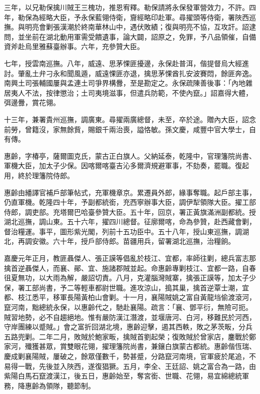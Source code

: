 \begin{pinyinscope}
三年，以兄勒保擒川賊王三槐功，推恩宥釋。勒保請將永保發軍營效力，不許。四年，勒保為經略大臣，予永保藍翎侍衛，齎經略印赴軍。尋擢頭等侍衛，署陜西巡撫。與明亮會剿張漢潮於終南華林山中，遇伏敗績；復與明亮不協，互攻訐。詔逮問，並坐前在湖北動用軍需受饋遺事，論大闢，詔原之，免罪，予八品領催，自備資斧赴烏里雅蘇臺辦事。六年，充參贊大臣。

七年，授雲南巡撫。八年，威遠、思茅惈匪擾邊，永保赴普洱，偕提督烏大經進討。肇亂土弁刁永和聞風遁，威遠惈匪亦退，擒思茅惈酋扎安波賽悶，餘匪奔逸。南興土司張輔國屢與孟連土司爭界構釁，至是勘定之。永保疏陳善後事：「內地雜居夷人不法，按律懲治；土司夷境滋事，但遣兵防範，不使內竄。」詔嘉得大體，弭邊釁，賞花翎。

十三年，兼署貴州巡撫，調廣東。尋擢兩廣總督，未至，卒於途。贈內大臣，詔念前勞，曾籍沒，家無餘貲，賜銀千兩治喪，謚恪敏。孫文慶，咸豐中官大學士，自有傳。

惠齡，字椿亭，薩爾圖克氏，蒙古正白旗人。父納延泰，乾隆中，官理籓院尚書、軍機大臣，加太子少保。因喀爾喀臺吉沁多爾濟規避軍事，不劾奏，罷職。復起用，終於理籓院侍郎。

惠齡由繙譯官補戶部筆帖式，充軍機章京。累遷員外郎，緣事奪職。起戶部主事，仍直軍機。乾隆四十年，予副都統銜，充西寧辦事大臣，調伊犁領隊大臣。擢工部侍郎，調吏部。充塔爾巴哈臺參贊大臣。五十年，回京，署正黃旗滿洲副都統。授湖北巡撫，調山東。五十六年，擢四川總督。征廓爾喀，命為參贊，赴西藏會剿，督治糧運。事平，圖形紫光閣，列前十五功臣中。五十八年，授山東巡撫，調湖北，再調安徽。六十年，授戶部侍郎。苗疆用兵，留署湖北巡撫，治糧餉。

嘉慶元年正月，教匪聶傑人、張正謨等倡亂於枝江、宜都，率師往剿，總兵富志那擒首逆聶傑人，而襄、鄖、宜、施諸郡賊並起。命惠齡專剿枝江、宜都一路，自春徂夏無功，以大雨為解，嚴詔切責。八月，克灌腦灣賊寨，擒張正謨等，加太子少保，署工部尚書，予二等輕車都尉世職。進攻涼山，搗其巢，擒首逆覃士潮，宜都、枝江悉平，移軍長陽黃柏山會剿。十一月，襄陽賊姚之富自黃龍垱偷渡滾河，竄河南，黜總統永保，以惠齡代之，馳赴襄陽。疏言：「襄、鄧平衍，無險可扼。賊習地勢，必不自趨絕地。惟有嚴防漢江潛渡，並堰唐河、白河，移難民於河西，守岸團練以蹙賊。」會之富折回湖北境，惠齡迎擊，遏其西軼，敗之茅茨畈，分兵五路兜剿。二年二月，敗賊於鮑家畈，擒賊首劉起榮；復敗賊於曾家店，鏖戰於鄭家河，殲獲甚眾，賞雙眼花翎，擢理籓院尚書，兼鑲白旗蒙古都統。惠齡偕恆瑞、慶成剿襄陽賊，屢破之，餘眾僅數千，勢甚蹙，分路竄河南境，官軍疲於尾追，不易得一戰，先後並入陜西，遂復猖獗。五月，李全、王廷詔、姚之富合為一路，由紫陽白馬石竄渡漢江，後五日，惠齡始至，奪宮銜、世職、花翎，易宜綿總統軍務，降惠齡為領隊，聽節制。


\end{pinyinscope}
